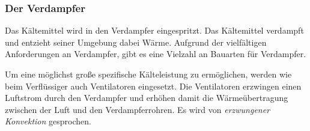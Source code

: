 \subsubsection*{Der Verdampfer}

Das Kältemittel wird in den Verdampfer eingespritzt. Das Kältemittel verdampft und entzieht seiner Umgebung dabei Wärme. Aufgrund der vielfältigen Anforderungen an Verdampfer, gibt es eine Vielzahl an Bauarten für Verdampfer.

Um eine möglichst große spezifische Kälteleistung zu ermöglichen, werden wie beim Verflüssiger auch Ventilatoren eingesetzt. Die Ventilatoren erzwingen einen Luftstrom durch den Verdampfer und erhöhen damit die Wärmeübertragung zwischen der Luft und den Verdampferrohren. Es wird von \textit{erzwungener Konvektion} gesprochen. 

